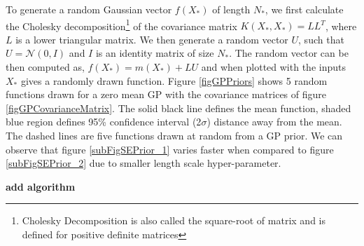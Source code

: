 \begin{mdframed}[hidealllines=true,backgroundcolor=lightgray!20]
To generate a random Gaussian vector $f(X_{*})$ of length $N_{*}$, we first calculate the Cholesky decomposition\footnote{Cholesky Decomposition is also called the square-root of matrix and is defined for positive definite matrices} of the covariance matrix $K(X_{*}, X_{*}) = LL^{T}$, where $L$ is a lower triangular matrix. We then generate a random vector $U$, such that $U = \mathcal{N}(0, I)$ and $I$ is an identity matrix of size $N_{*}$.  The random vector can be then computed as, $f(X_{*}) = m(X_{*}) + LU$ and when plotted with the inputs $X_{*}$ gives a randomly drawn function. Figure \ref{figGPPriors} shows 5 random functions drawn for a zero mean GP with the covariance matrices of figure \ref{figGPCovarianceMatrix}. The solid black line defines the mean function, shaded blue region defines 95\% confidence interval (2$\sigma$) distance away from the mean. The dashed lines are five functions drawn at random from a GP prior. We can observe that figure \ref{subFigSEPrior_1} varies faster when compared to figure \ref{subFigSEPrior_2} due to smaller length scale hyper-parameter. 

\textbf{add algorithm}

\end{mdframed}

